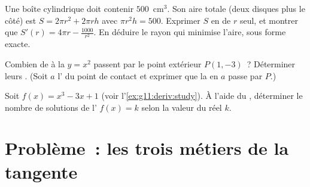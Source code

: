 \begin{exercise}[$\star\star$]\label{exo:g11:deriv:10}
Une boîte cylindrique doit contenir $500$~cm$^3$. Son aire totale (deux
disques plus le côté) est $S = 2\pi r^2 + 2\pi r h$ avec
$\pi r^2 h = 500$. Exprimer $S$ en  de $r$ seul, et montrer que
$S'(r) = 4\pi r - \frac{1000}{r^2}$. En déduire le rayon qui minimise
l'aire, sous forme exacte.
\end{exercise}

\begin{exercise}[$\star\star\star$]\label{exo:g11:deriv:11}
Combien de  à la  $y = x^2$ passent par le point
extérieur $P(1, -3)$~? Déterminer leurs . (Soit $a$ l'
du point de contact et exprimer que la  en $a$ passe par $P$.)
\end{exercise}

\begin{exercise}[$\star\star\star$]\label{exo:g11:deriv:12}
Soit $f(x) = x^3 - 3x + 1$ (voir l'\cref{ex:g11:deriv:study}). À l'aide
du , déterminer le nombre de solutions de
l' $f(x) = k$ selon la valeur du réel $k$.
\end{exercise}

\section{Problème~: les trois métiers de la tangente}

